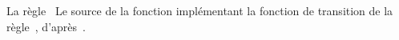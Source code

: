 %
{}%
{La r\`egle~}%
{\label{rule-tube-worm}%
  Le source de la fonction  impl\'ementant la fonction de
  transition de la r\`egle~,
  d'apr\`es~\cite{Toffoli87}.}

